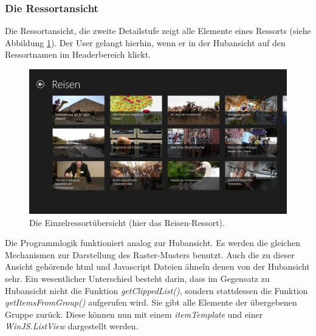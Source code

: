 \documentclass[12pt,a4paper,bibtotoc,abstracton]{scrartcl}
\begin{document}
\begin{minipage}{\linewidth}
  
\end{minipage}

\subsubsection{Die Ressortansicht}
\label{subsubsec:ressortansicht}
Die Ressortansicht, die zweite Detailstufe zeigt alle Elemente eines Ressorts (siehe Abbildung \ref{fig:einzelressortübersicht}). Der User gelangt hierhin, wenn er in der Hubansicht auf den Ressortnamen im Headerbereich klickt. 

\begin{figure}[h]
	\centering
	\includegraphics[width=\textwidth]{Bilder/Screenshots/app/reise_aegypten_3gdmit.png} 
	\caption[Die Einzelressortübersicht]{Die Einzelressortübersicht (hier das Reisen-Ressort).}
	\label{fig:einzelressortübersicht}
\end{figure}

Die Programmlogik funktioniert analog zur Hubansicht. Es werden die gleichen Mechanismen zur Darstellung des Raster-Musters benutzt. Auch die zu dieser Ansicht gehörende \ac{html} und Javascript Dateien ähneln denen von der Hubansicht sehr. Ein wesentlicher Unterschied besteht darin, dass im Gegensatz zu Hubansicht nicht die Funktion \textit{getClippedList()}, sondern stattdessen die Funktion \textit{getItemsFromGroup()} aufgerufen wird. Sie gibt alle Elemente der übergebenen Gruppe zurück. Diese können nun mit einem \textit{itemTemplate} und einer \textit{WinJS.ListView} dargestellt werden. 
\end{document}

